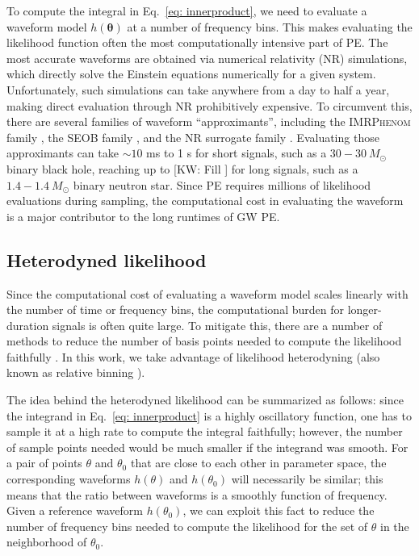 \documentclass[twocolumn]{aastex631}
\newcommand{\kw}[1]{{\color{rb4}[KW: #1 ]}}
\begin{document}
To compute the integral in Eq.~\eqref{eq: innerproduct}, we need to evaluate a
waveform model $h(\mathbf{\theta})$ at a number of frequency bins. This makes
evaluating the likelihood function often the most computationally intensive
part of PE. The most accurate waveforms are obtained via numerical relativity
(NR) simulations, which directly solve the Einstein equations numerically for a
given system. Unfortunately, such simulations can take anywhere from a day to
half a year, making direct evaluation through NR prohibitively expensive. To
circumvent this, there are several families of waveform ``approximants'',
including the \textsc{IMRPhenom} family \cite{Khan:2015jqa,
Garcia-Quiros:2020qpx}, the \textsc{SEOB} family \cite{PhysRevD.89.061502}, and
the NR surrogate family \cite{Varma:2019csw}. Evaluating those approximants can
take ${\sim}10$ ms to 1 s for short signals, such as a $30-30\ M_{\odot}$
binary black hole, reaching up to \kw{Fill} for long signals, such as a
$1.4-1.4\ M_{\odot}$ binary neutron star.  Since PE requires millions of
likelihood evaluations during sampling, the computational cost in evaluating
the waveform is a major contributor to the long runtimes of GW PE.

\subsection{Heterodyned likelihood}

Since the computational cost of evaluating a waveform model scales linearly
with the number of time or frequency bins, the computational burden for
longer-duration signals is often quite large. To mitigate this, there are a
number of methods to reduce the number of basis points needed to compute the
likelihood faithfully \cite{Field:2011mf, Field:2013cfa, Smith:2016qas,
Vinciguerra:2017ngf}. In this work, we take advantage of likelihood
heterodyning \cite{Cornish:2021lje} (also known as relative binning
\cite{Zackay:2018qdy}).

The idea behind the heterodyned likelihood can be summarized as follows: since
the integrand in Eq.~\eqref{eq: innerproduct} is a highly oscillatory function,
one has to sample it at a high rate to compute the integral faithfully;
however, the number of sample points needed would be much smaller if the
integrand was smooth. For a pair of points $\theta$ and $\theta_0$ that are
close to each other in parameter space, the corresponding waveforms $h(\theta)$
and $h(\theta_0)$ will necessarily be similar; this means that the ratio
between waveforms is a smoothly function of frequency. Given a reference
waveform $h(\theta_0)$, we can exploit this fact to reduce the number of
frequency bins needed to compute the likelihood for the set of $\theta$ in the
neighborhood of $\theta_0$.
\end{document}
